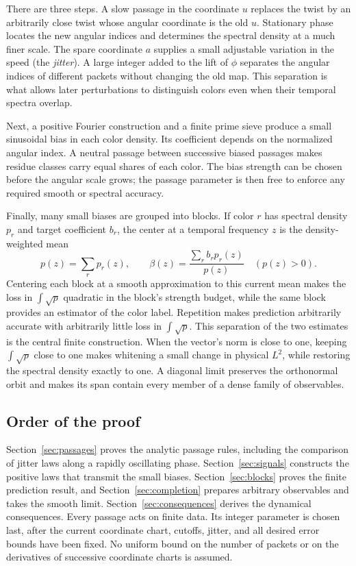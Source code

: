 There are three steps. A slow passage in the coordinate $u$ replaces the
twist by an arbitrarily close twist whose angular coordinate is the old
$u$. Stationary phase locates the new angular indices and determines the
spectral density at a much finer scale. The spare coordinate $a$ supplies
a small adjustable variation in the speed (the \emph{jitter}). A large integer added to the
lift of $\phi$ separates the angular indices of different packets without
changing the old map. This separation is what allows later perturbations
to distinguish colors even when their temporal spectra overlap.

Next, a positive Fourier construction and a finite prime sieve produce a
small sinusoidal bias in each color density. Its coefficient depends on
the normalized angular index. A neutral passage between successive biased
passages makes residue classes carry equal shares of each color. The
bias strength can be chosen before the angular scale grows; the passage
parameter is then free to enforce any required smooth or spectral
accuracy.

Finally, many small biases are grouped into blocks. If color $r$ has
spectral density $p_r$ and target coefficient $b_r$, the center at a
temporal frequency $z$ is the density-weighted mean
\[
 p(z)=\sum_r p_r(z),\qquad
 \beta(z)=\frac{\sum_r b_rp_r(z)}{p(z)}\quad(p(z)>0).
\]
Centering each block at a smooth approximation to this current mean
makes the loss in $\int\sqrt p$ quadratic
in the block's strength budget, while the same block provides an estimator
of the color label. Repetition makes prediction arbitrarily accurate with
arbitrarily little loss in $\int\sqrt p$. This separation of the two
estimates is the central finite construction. When the vector's norm is
close to one, keeping $\int\sqrt p$ close to one makes whitening a small
change in physical $L^2$, while restoring the spectral density exactly
to one. A diagonal limit preserves the orthonormal orbit and makes its
span contain every member of a dense family of observables.

\subsection*{Order of the proof}
Section~\ref{sec:passages} proves the analytic passage rules, including the
comparison of jitter laws along a rapidly oscillating phase.
Section~\ref{sec:signals} constructs the positive laws that transmit the
small biases. Section~\ref{sec:blocks} proves the finite prediction result,
and Section~\ref{sec:completion} prepares arbitrary observables and takes
the smooth limit. Section~\ref{sec:consequences} derives the dynamical
consequences. Every passage acts on finite data. Its integer parameter
is chosen last, after the current coordinate chart, cutoffs, jitter,
and all desired error bounds have been fixed. No uniform bound on the
number of packets or on the derivatives of successive coordinate charts
is assumed.

